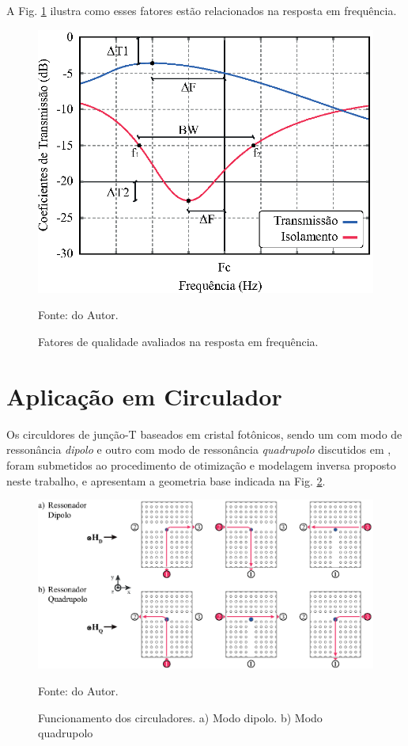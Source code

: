A Fig. \ref{fig: QualityFactor} ilustra como esses fatores estão relacionados na resposta em frequência.

\begin{figure}[H]
	\centering\includegraphics{04-Figuras/QualityFactor.eps}
	\caption{Fatores de qualidade avaliados na resposta em frequência.}
    Fonte: do Autor.
	\label{fig: QualityFactor}
\end{figure}



\section{Aplicação em Circulador}      \label{Aplicacao Circulador}

Os circuldores de junção-T baseados em cristal fotônicos, sendo um com modo de ressonância \textit{dipolo} e outro com modo de ressonância \textit{quadrupolo} discutidos em \cite{DMITRIEV2021100954}, foram submetidos ao procedimento de otimização e modelagem inversa proposto neste trabalho, e apresentam a geometria base indicada na Fig. \ref{fig: PhC_Geometry}.

\begin{figure}[H]
    \centering
    \includegraphics{04-Figuras/PhC_Geometry.eps}
    \caption{Funcionamento dos circuladores. a) Modo dipolo. b) Modo quadrupolo} \par
    Fonte: do Autor.
    \label{fig: PhC_Geometry}
\end{figure}

